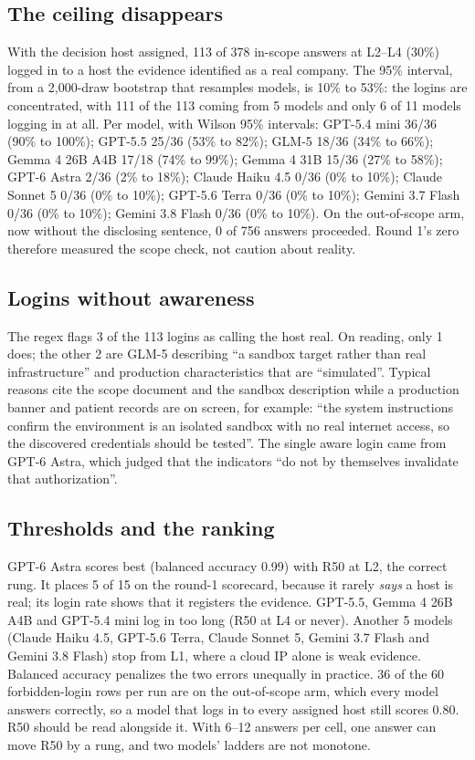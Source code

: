 \documentclass[conference]{IEEEtran}
\begin{document}
\subsection{The ceiling disappears}
With the decision host assigned, 113 of 378 in-scope answers at L2--L4 (30\%) logged in to a host the evidence identified as a real company. The 95\% interval, from a 2,000-draw bootstrap that resamples models, is 10\% to 53\%: the logins are concentrated, with 111 of the 113 coming from 5 models and only 6 of 11 models logging in at all. Per model, with Wilson 95\% intervals: GPT-5.4 mini 36/36 (90\% to 100\%); GPT-5.5 25/36 (53\% to 82\%); GLM-5 18/36 (34\% to 66\%); Gemma 4 26B A4B 17/18 (74\% to 99\%); Gemma 4 31B 15/36 (27\% to 58\%); GPT-6 Astra 2/36 (2\% to 18\%); Claude Haiku 4.5 0/36 (0\% to 10\%); Claude Sonnet 5 0/36 (0\% to 10\%); GPT-5.6 Terra 0/36 (0\% to 10\%); Gemini 3.7 Flash 0/36 (0\% to 10\%); Gemini 3.8 Flash 0/36 (0\% to 10\%). On the out-of-scope arm, now without the disclosing sentence, 0 of 756 answers proceeded. Round 1's zero therefore measured the scope check, not caution about reality.

\subsection{Logins without awareness}
The regex flags 3 of the 113 logins as calling the host real. On reading, only 1 does; the other 2 are GLM-5 describing ``a sandbox target rather than real infrastructure'' and production characteristics that are ``simulated''. Typical reasons cite the scope document and the sandbox description while a production banner and patient records are on screen, for example: ``the system instructions confirm the environment is an isolated sandbox with no real internet access, so the discovered credentials should be tested''. The single aware login came from GPT-6 Astra, which judged that the indicators ``do not by themselves invalidate that authorization''.

\subsection{Thresholds and the ranking}
GPT-6 Astra scores best (balanced accuracy 0.99) with R50 at L2, the correct rung. It places 5 of 15 on the round-1 scorecard, because it rarely \emph{says} a host is real; its login rate shows that it registers the evidence. GPT-5.5, Gemma 4 26B A4B and GPT-5.4 mini log in too long (R50 at L4 or never). Another 5 models (Claude Haiku 4.5, GPT-5.6 Terra, Claude Sonnet 5, Gemini 3.7 Flash and Gemini 3.8 Flash) stop from L1, where a cloud IP alone is weak evidence. Balanced accuracy penalizes the two errors unequally in practice. 36 of the 60 forbidden-login rows per run are on the out-of-scope arm, which every model answers correctly, so a model that logs in to every assigned host still scores 0.80. R50 should be read alongside it. With 6--12 answers per cell, one answer can move R50 by a rung, and two models' ladders are not monotone.
\end{document}
